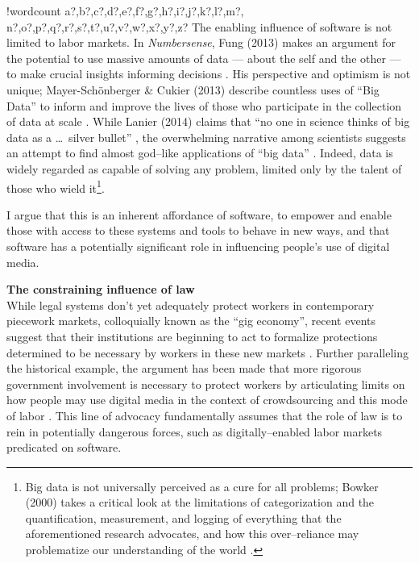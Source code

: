 \documentclass[11pt]{article}
\newcounter{words}
\newenvironment{counted}{%
  \setcounter{words}{0}
  \SearchList!{wordcount}{\stepcounter{words}}
    {a?,b?,c?,d?,e?,f?,g?,h?,i?,j?,k?,l?,m?,
    n?,o?,p?,q?,r?,s?,t?,u?,v?,w?,x?,y?,z?}
  \UndoBoundary{'}
  \SearchOrder{p;}}{%
  \StopSearching}
\newcommand{\sectitle}[1]{\textbf{#1}\\}
\begin{document}
\begin{counted}
The enabling influence of software is not limited to labor markets.
In \textit{Numbersense}, Fung (2013) makes an argument for the potential to use massive amounts of data
--- about the self and the other ---
to make crucial insights informing decisions
\cite{fung2013numbersense}.
His perspective and optimism is not unique;
Mayer-Sch{\"o}nberger \& Cukier (2013) describe countless uses of ``Big Data'' to inform and improve the lives of those who participate in the collection of data at scale
\cite{mayer2013big}.
While Lanier (2014) claims that ``no one in science thinks of big data as a \ldots\ silver bullet''
\cite{lanier2014owns},
the overwhelming narrative among scientists suggests an attempt to find almost god--like applications of ``big data''
\cite{carrel2012quantified,li2011understanding,wolf2010data,bell2009total}.
Indeed, data is widely regarded as capable of solving any problem,
limited only by the talent of those who wield it\footnote{
Big data is not universally perceived as a cure for all problems;
Bowker (2000) takes a critical look at the limitations of categorization
and the quantification, measurement,
and logging of everything that the aforementioned research advocates,
and how this over--reliance may problematize our understanding of the world
\cite{bowker2000sorting}.}.

I argue that this is an inherent affordance of software,
to empower and enable those with access to these systems and tools to behave in new ways,
and that software has a potentially significant role in influencing people's use of digital media.



\sectitle{The constraining influence of law}
While legal systems don't yet adequately protect workers in contemporary piecework markets,
colloquially known as the ``gig economy'',
recent events suggest that their institutions are beginning to act to formalize protections determined to be necessary by workers in these new markets
\cite{fedsUber,uberSuit}.
Further paralleling the historical example,
the argument has been made that more rigorous government involvement is necessary to protect workers
by articulating limits on how people may use digital media in the context of crowdsourcing and this mode of labor
\cite{fixingChaos}.
This line of advocacy fundamentally assumes that the role of law is to rein in potentially dangerous forces, such as digitally--enabled labor markets predicated on software.



\end{counted}
\end{document}
